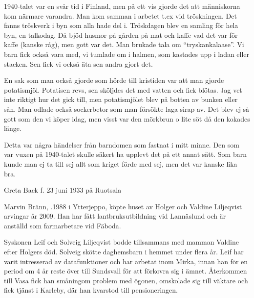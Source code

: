 1940-talet var en svår tid i Finland, men på ett vis gjorde det att människorna kom närmare varandra. Man kom samman i arbetet t.ex vid tröskningen. Det fanns tröskverk i byn som alla hade del i. Tröskdagen blev en samling för hela byn, en talkodag. Då bjöd husmor på gården på mat och kaffe vad det var för kaffe (kanske råg), men gott var det. Man brukade tala om ``tryskankalaase''. Vi barn fick också vara med, vi tumlade om i halmen, som kastades upp i ladan eller stacken. Sen fick vi också äta sen andra gjort det.

En sak som man också gjorde som hörde till kristiden var att man gjorde potatismjöl. Potatisen revs, sen sköljdes det med vatten och fick blötas. Jag vet inte riktigt hur det gick till, men potatismjölet blev på botten av bunken eller sån. Man odlade också sockerbetor som man försökte laga sirap av. Det blev ej så gott som den vi köper idag, men visst var den mörkbrun o lite söt då den kokades länge.

Detta var några händelser från barndomen som fastnat i mitt minne. Den som var vuxen på 1940-talet skulle säkert ha upplevt det på ett annat sätt. Som barn kunde man ej ta till sej allt som kriget förde med sej, men det var kanske lika bra.

Greta Back f. 23 juni 1933 på Ruotsala






Marvin Bränn, .1988 i Ytterjeppo, köpte huset av Holger och Valdine Liljeqvist arvingar år 2009. Han har fått lantbruksutbildning vid Lannäslund och är anställd som farmarbetare vid Fäboda.\jhvspace{}


Syskonen Leif och Solveig Liljeqvist bodde tillsammans med mamman  Valdine efter Holgers död. Solveig skötte daghemsbarn i hemmet under flera år. Leif har varit intresserad av datafunktioner och har arbetat inom Mirka, innan han för en period om 4 år reste över till Sundsvall för att förkovra sig i ämnet. Återkommen till Vasa fick han småningom problem med ögonen, omskolade sig till väktare och fick tjänst i Karleby, där han kvarstod till pensioneringen.


